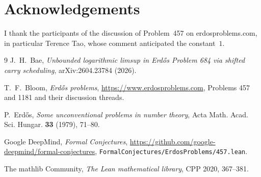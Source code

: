 \documentclass[11pt]{article}
\theoremstyle{remark}
\begin{document}
\section*{Acknowledgements}
I thank the participants of the discussion of Problem~457 on erdosproblems.com, in particular
Terence Tao, whose comment anticipated the constant~\(1\).

\begin{thebibliography}{9}
\small
{}
J.~H.~Bae, \emph{Unbounded logarithmic limsup in Erd\H{o}s Problem 684 via shifted carry
scheduling}, arXiv:2604.23784 (2026).

T.~F.~Bloom, \emph{Erd\H{o}s problems}, \url{https://www.erdosproblems.com}, Problems 457 and
1181 and their discussion threads.

P.~Erd\H{o}s, \emph{Some unconventional problems in number theory}, Acta Math. Acad. Sci.
Hungar. \textbf{33} (1979), 71--80.

Google DeepMind, \emph{Formal Conjectures},
\url{https://github.com/google-deepmind/formal-conjectures},
\texttt{FormalConjectures/ErdosProblems/457.lean}.

The mathlib Community, \emph{The Lean mathematical library}, CPP 2020, 367--381.
\end{thebibliography}
\end{document}
